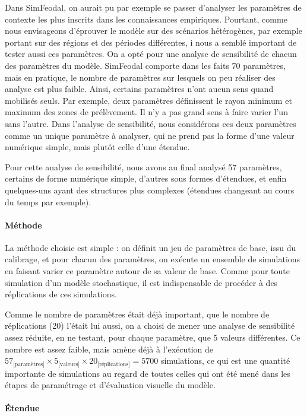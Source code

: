 Dans SimFeodal, on aurait pu par exemple se passer d'analyser les paramètres de contexte les plus inscrits dans les connaissances empiriques.
Pourtant, comme nous envisageons d'éprouver le modèle sur des scénarios hétérogènes, par exemple portant sur des régions et des périodes différentes, i nous a semblé important de tester aussi ces paramètres.
On a opté pour une analyse de sensibilité de chacun des paramètres du modèle.
SimFeodal comporte dans les faits 70 paramètres, mais en pratique, le nombre de paramètres sur lesquels on peu réaliser des analyse est plus faible.
Ainsi, certains paramètres n'ont aucun sens quand mobilisés seuls.
Par exemple, deux paramètres définissent le rayon minimum et maximum des zones de prélèvement.
Il n'y a pas grand sens à faire varier l'un sans l'autre.
Dans l'analyse de sensibilité, nous considérons ces deux paramètres comme un unique paramètre à analyser, qui ne prend pas la forme d'une valeur numérique simple, mais plutôt celle d'une étendue.

Pour cette analyse de sensibilité, nous avons au final analysé 57 \og paramètres\fg{}, certains de forme numérique simple, d'autres sous formes d'étendues, et enfin quelques-uns ayant des structures plus complexes (étendues changeant au cours du temps par exemple).

\paragraph{Méthode}

La méthode choisie est simple : on définit un jeu de paramètres de base, issu du calibrage, et pour chacun des paramètres, on exécute un ensemble de simulations en faisant varier ce paramètre autour de sa valeur de base.
Comme pour toute simulation d'un modèle stochastique, il est indispensable de procéder à des réplications de ces simulations.

Comme le nombre de paramètres était déjà important, que le nombre de réplications (20) l'était lui aussi, on a choisi de mener une analyse de sensibilité assez réduite, en ne testant, pour chaque paramètre, que 5 valeurs différentes.
Ce nombre est assez faible, mais amène déjà à l'exécution de $57_{\text{[paramètres]}} \times 5_{\text{[valeurs]}} \times 20_{\text{[réplications]}} = 5700$ simulations, ce qui est une quantité importante de simulations au regard de toutes celles qui ont été mené dans les étapes de paramétrage et d'évaluation visuelle du modèle.

\paragraph{Étendue}
\label{par:etendue-parametres}

